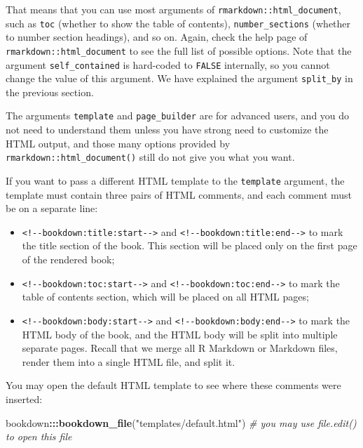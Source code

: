 \documentclass[
  12pt,
]{krantz}
\newenvironment{Shaded}{\begin{snugshade}}{\end{snugshade}}
\newcommand{\CommentTok}[1]{\textcolor[rgb]{0.56,0.35,0.01}{\textit{#1}}}
\newcommand{\FunctionTok}[1]{\textcolor[rgb]{0.13,0.29,0.53}{\textbf{#1}}}
\newcommand{\NormalTok}[1]{#1}
\newcommand{\SpecialCharTok}[1]{\textcolor[rgb]{0.81,0.36,0.00}{\textbf{#1}}}
\newcommand{\StringTok}[1]{\textcolor[rgb]{0.31,0.60,0.02}{#1}}
\providecommand{\tightlist}{%
  \setlength{\itemsep}{0pt}\setlength{\parskip}{0pt}}
\theoremstyle{definition}
\theoremstyle{definition}
\theoremstyle{definition}
\theoremstyle{definition}
\theoremstyle{remark}
\begin{document}
That means that you can use most arguments of \texttt{rmarkdown::html\_document}, such as \texttt{toc} (whether to show the table of contents), \texttt{number\_sections} (whether to number section headings), and so on. Again, check the help page of \texttt{rmarkdown::html\_document} to see the full list of possible options. Note that the argument \texttt{self\_contained} is hard-coded to \texttt{FALSE} internally, so you cannot change the value of this argument. We have explained the argument \texttt{split\_by} in the previous section.

The arguments \texttt{template} and \texttt{page\_builder} are for advanced users, and you do not need to understand them unless you have strong need to customize the HTML output, and those many options provided by \texttt{rmarkdown::html\_document()} still do not give you what you want.

If you want to pass a different HTML template to the \texttt{template} argument, the template must contain three pairs of HTML comments, and each comment must be on a separate line:

\begin{itemize}
\tightlist
\item
  \texttt{\textless{}!-\/-bookdown:title:start-\/-\textgreater{}} and \texttt{\textless{}!-\/-bookdown:title:end-\/-\textgreater{}} to mark the title section of the book. This section will be placed only on the first page of the rendered book;
\item
  \texttt{\textless{}!-\/-bookdown:toc:start-\/-\textgreater{}} and \texttt{\textless{}!-\/-bookdown:toc:end-\/-\textgreater{}} to mark the table of contents section, which will be placed on all HTML pages;
\item
  \texttt{\textless{}!-\/-bookdown:body:start-\/-\textgreater{}} and \texttt{\textless{}!-\/-bookdown:body:end-\/-\textgreater{}} to mark the HTML body of the book, and the HTML body will be split into multiple separate pages. Recall that we merge all R Markdown or Markdown files, render them into a single HTML file, and split it.
\end{itemize}

You may open the default HTML template to see where these comments were inserted:

\begin{Shaded}
\begin{Highlighting}[]
\NormalTok{bookdown}\SpecialCharTok{:::}\FunctionTok{bookdown\_file}\NormalTok{(}\StringTok{"templates/default.html"}\NormalTok{)}
\CommentTok{\# you may use file.edit() to open this file}
\end{Highlighting}
\end{Shaded}
\end{document}
